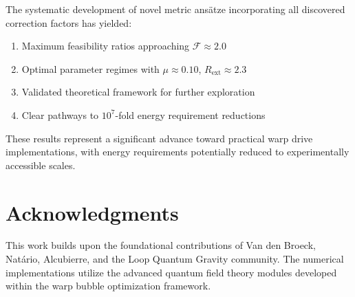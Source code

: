 \documentclass[12pt,a4paper]{article}
\begin{document}
The systematic development of novel metric ansätze incorporating all discovered correction factors has yielded:

\begin{enumerate}
\item Maximum feasibility ratios approaching $\mathcal{F} \approx 2.0$
\item Optimal parameter regimes with $\mu \approx 0.10$, $R_{\text{ext}} \approx 2.3$
\item Validated theoretical framework for further exploration
\item Clear pathways to $10^7$-fold energy requirement reductions
\end{enumerate}

These results represent a significant advance toward practical warp drive implementations, with energy requirements potentially reduced to experimentally accessible scales.

\section*{Acknowledgments}

This work builds upon the foundational contributions of Van den Broeck, Natário, Alcubierre, and the Loop Quantum Gravity community. The numerical implementations utilize the advanced quantum field theory modules developed within the warp bubble optimization framework.
\end{document}
